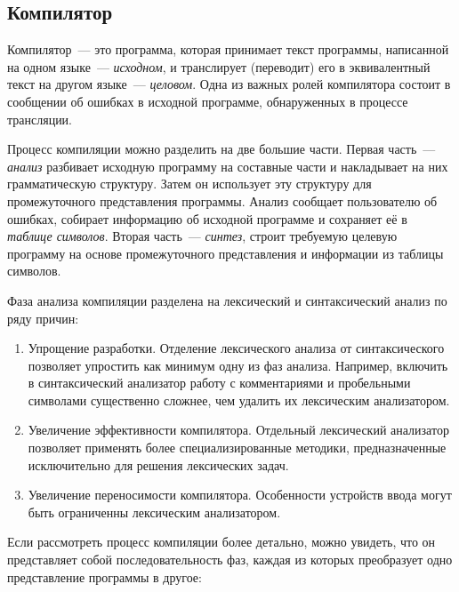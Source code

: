 \subsection{Компилятор} \label{sub111}

Компилятор~--- это программа, которая  принимает текст программы, написанной на одном языке~--- \textit{исходном}, и транслирует (переводит) его в эквивалентный текст на другом языке~--- \textit{целовом}. Одна из важных ролей компилятора состоит в сообщении об ошибках в исходной программе, обнаруженных в процессе трансляции.

Процесс компиляции можно разделить на две большие части. Первая часть~--- \textit{анализ} разбивает исходную программу на составные части и накладывает на них грамматическую структуру. Затем он использует эту структуру для промежуточного представления программы. Анализ сообщает пользователю об ошибках, собирает информацию об исходной программе и сохраняет её в \textit{таблице символов}. Вторая часть~--- \textit{синтез}, строит требуемую целевую программу на основе промежуточного представления и информации из таблицы символов.

Фаза анализа компиляции разделена на лексический и синтаксический анализ по ряду причин: 

\begin{enumerate} 
	\item{Упрощение разработки. Отделение лексического анализа от синтаксического позволяет упростить как минимум одну из фаз анализа. Например, включить в синтаксический анализатор работу с комментариями и пробельными символами существенно сложнее, чем удалить их лексическим анализатором.}
	\item{Увеличение эффективности компилятора. Отдельный лексический анализатор позволяет применять более специализированные методики, предназначенные исключительно для решения лексических задач.}
	\item{Увеличение переносимости компилятора. Особенности устройств ввода могут быть ограниченны лексическим анализатором.}
\end{enumerate}

Если рассмотреть процесс компиляции более детально, можно увидеть, что он представляет собой последовательность фаз, каждая из которых преобразует одно представление программы в другое:

